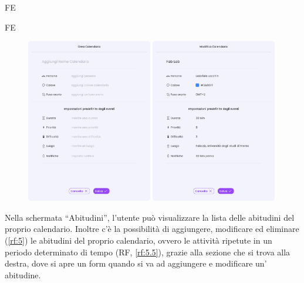 \begin{listaPersonale}{FE}
\begin{listaPersonale2}{FE}
        \begin{center} 
            \begin{figure}[H]
            \centering\includegraphics[width=0.49\textwidth,height=0.35\textheight]{img/FrontEnd/Eventi/Calendario/CreaCalendario1.png}
            \centering\includegraphics[width=0.49\textwidth,height=0.35\textheight]{img/FrontEnd/Eventi/Calendario/ModificaCalendario.png}
            \end{figure}
        \end{center}
        
    \end{listaPersonale2}
    \pagebreak
     Nella schermata “Abitudini”, l’utente può visualizzare la lista delle abitudini del proprio calendario. Inoltre c’è la possibilità di aggiungere, modificare ed eliminare (\ref{rf:5}) le abitudini del proprio calendario, ovvero le attività ripetute in un periodo determinato di tempo (RF, \ref{rf:5.5}), grazie alla sezione che si trova alla destra, dove si apre un form quando si va ad aggiungere e modificare un’ abitudine.


\end{listaPersonale}
